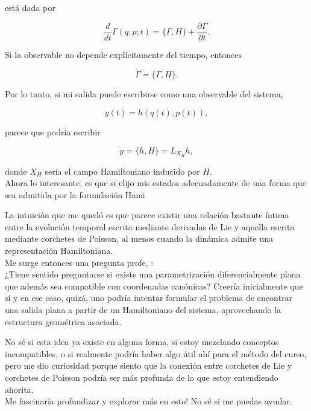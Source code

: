\documentclass[10pt, oneside]{article}
\begin{document}
está dada por

\begin{equation}
	\frac{d}{dt}
	\Gamma(q,p;t)
	=
	\{\Gamma,H\}
	+
	\frac{\partial \Gamma}{\partial t}.
\end{equation}

Si la observable no depende explícitamente del tiempo, entonces

\begin{equation}
	\dot{\Gamma}
	=
	\{\Gamma,H\}.
\end{equation}

Por lo tanto, si mi salida puede escribirse como una observable del sistema,

\begin{equation}
	y(t)
	=
	h(q(t),p(t)),
\end{equation}

parece que podría escribir

\begin{equation}
	\dot y
	=
	\{h,H\}
	=
	L_{X_H}h,
\end{equation}

donde $X_H$ sería el campo Hamiltoniano inducido por $H$. \\ 

Ahora lo interesante, es que si elijo mis estados adecuadamente de una forma que sea admitida por la formulación Hami

La intuición que me quedó es que parece existir una relación bastante íntima entre la evolución temporal escrita mediante derivadas de Lie y aquella escrita mediante corchetes de Poisson, al menos cuando la dinámica admite una representación Hamiltoniana.\\


Me surge entonces una pregunta profe, : \\



¿Tiene sentido preguntarse si existe una parametrización diferencialmente plana que además sea compatible con coordenadas canónicas? Creería inicialmente que sí y en ese caso, quizá, uno podría intentar formular el problema de encontrar una salida plana a partir de un Hamiltoniano del sistema, aprovechando la estructura geométrica asociada.

No sé si esta idea ya existe en alguna forma, si estoy mezclando conceptos incompatibles, o si realmente podría haber algo útil ahí para el método del curso, pero me dio curiosidad porque siento que la conexión entre corchetes de Lie y corchetes de Poisson podría ser más profunda de lo que estoy entendiendo ahorita.\\

Me fascinaría profundizar y explorar más en esto! No sé si me puedas ayudar. 
\end{document}
